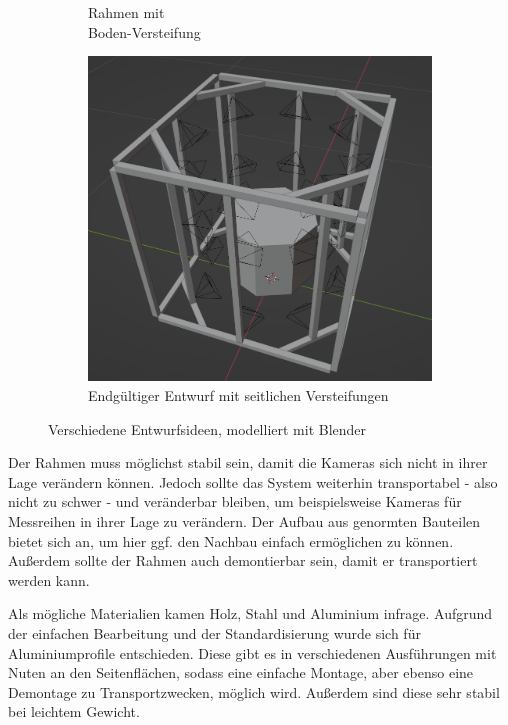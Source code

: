 \documentclass[./00PhotoBox.tex]{subfiles}
\begin{document}
\begin{figure}
\begin{subfigure}{0.30\textwidth}
        \centering
        \caption{Rahmen mit\\Boden-Versteifung}
        \label{img:entwurf2}
    \end{subfigure}
    \begin{subfigure}{0.30\textwidth}
        \includegraphics[height=1\linewidth]{./img/3_aufbau/modell3.png}
        \centering
        \caption{Endgültiger Entwurf mit seitlichen Versteifungen}
        \label{img:entwurf3}
    \end{subfigure}
    \caption{Verschiedene Entwurfsideen, modelliert mit Blender}
    \label{img:entwuerfe}
\end{figure}


Der Rahmen muss möglichst stabil sein, damit die Kameras sich nicht in ihrer Lage verändern können. Jedoch sollte das System weiterhin transportabel - also nicht zu schwer - und veränderbar bleiben, um beispielsweise Kameras für Messreihen in ihrer Lage zu verändern. Der Aufbau aus genormten Bauteilen bietet sich an, um hier ggf. den Nachbau einfach ermöglichen zu können. Außerdem sollte der Rahmen auch demontierbar sein, damit er transportiert werden kann.

Als mögliche Materialien kamen Holz, Stahl und Aluminium infrage. Aufgrund der einfachen Bearbeitung und der Standardisierung wurde sich für Aluminiumprofile entschieden. Diese gibt es in verschiedenen Ausführungen mit Nuten an den Seitenflächen, sodass eine einfache Montage, aber ebenso eine Demontage zu Transportzwecken, möglich wird. Außerdem sind diese sehr stabil bei leichtem Gewicht.
\end{document}
